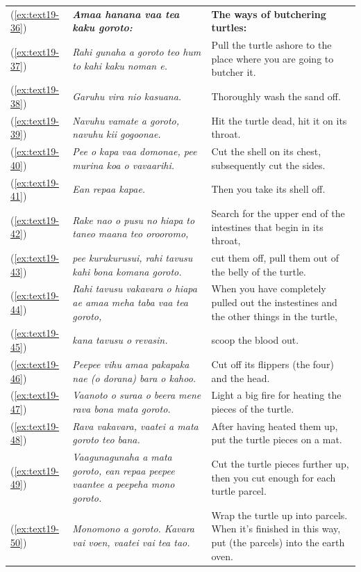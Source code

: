 \documentclass[output=paper]{langscibook}
\begin{document}
\begin{xltabular}{\textwidth}{lXX}
	(\ref{ex:text19-36})&\textit{\textbf{Amaa hanana vaa tea kaku goroto:}}&\textbf{The ways of butchering turtles:}\\
	(\ref{ex:text19-37})&\textit{Rahi gunaha a goroto teo hum to kahi kaku noman e.}&Pull the turtle ashore to the place where you are going to butcher it.\\
	(\ref{ex:text19-38})&\textit{Garuhu vira nio kasuana.}&Thoroughly wash the sand off.\\
	(\ref{ex:text19-39})&\textit{Navuhu vamate a goroto, navuhu kii gogoonae.}&Hit the turtle dead, hit it on its throat.\\
	(\ref{ex:text19-40})&\textit{Pee o kapa vaa domonae, pee murina koa o vavaarihi.}&Cut the shell on its chest, subsequently cut the sides.\\
	(\ref{ex:text19-41})&\textit{Ean repaa kapae.}&Then you take its shell off.\\
	(\ref{ex:text19-42})&\textit{Rake nao o pusu no hiapa to taneo maana teo orooromo,}&Search for the upper end of the intestines that begin in its throat,\\
	(\ref{ex:text19-43})&\textit{pee kurukurusui, rahi tavusu kahi bona komana goroto.}&cut them off, pull them out of the belly of the turtle.\\
	(\ref{ex:text19-44})&\textit{Rahi tavusu vakavara o hiapa ae amaa meha taba vaa tea goroto,}&When you have completely pulled out the instestines and the other things in the turtle,\\
	(\ref{ex:text19-45})&\textit{kana tavusu o revasin. }&scoop the blood out.\\
	(\ref{ex:text19-46})&\textit{Peepee vihu amaa pakapaka nae (o dorana) bara o kahoo.}&Cut off its flippers (the four) and the head.\\
	(\ref{ex:text19-47})&\textit{Vaanoto o suraa o beera mene rava bona mata goroto.}&Light a big fire for heating the pieces of the turtle.\\
	(\ref{ex:text19-48})&\textit{Rava vakavara, vaatei a mata goroto teo bana.}&After having heated them up, put the turtle pieces on a mat.\\
	(\ref{ex:text19-49})&\textit{Vaagunagunaha a mata goroto, ean repaa peepee vaantee a peepeha mono goroto.}&Cut the turtle pieces further up, then you cut enough for each turtle parcel.\\
	(\ref{ex:text19-50})&\textit{Monomono a goroto. Kavara vai voen, vaatei vai tea tao.}&Wrap the turtle up into parcels. When it's finished in this way, put (the parcels) into the earth oven.\\

\end{xltabular}
\end{document}
